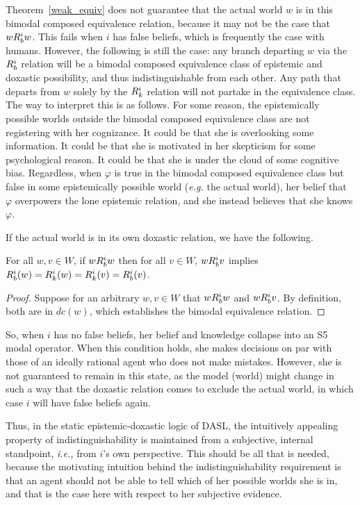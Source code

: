 Theorem~\ref{weak_equiv} does not guarantee that the actual world $w$ is in this bimodal composed equivalence relation, because it may not be the case that $wR_{b}^iw$. This fails when $i$ has false beliefs, which is frequently the case with humans. However, the following is still the case: any branch departing $w$ via the $R_{b}^i$ relation will be a bimodal composed equivalence class of epistemic and doxastic possibility, and thus indistinguishable from each other. Any path that departs from $w$ solely by the $R_{k}^i$ relation will not partake in the equivalence class. The way to interpret this is as follows. For some reason, the epistemically possible worlds outside the bimodal composed equivalence class are not registering with her cognizance. It could be that she is overlooking some information. It could be that she is motivated in her skepticism for some psychological reason. It could be that she is under the cloud of some cognitive bias. Regardless, when $\varphi$ is true in the bimodal composed equivalence class but false in some epistemically possible world (\emph{e.g.} the actual world), her belief that $\varphi$ overpowers the lone epistemic relation, and she instead believes that she knows $\varphi$.

If the actual world is in its own doxastic relation, we have the following. 

\begin{theorem}
	For all $w,v \in W$, if $wR_{b}^i w$ then for all $v \in W$, $wR_{b}^iv$ implies $R_{b}^i(w) = R_{k}^i(w) = R_{k}^i(v) = R_{b}^i(v)$.
\end{theorem}
\begin{proof}
	Suppose for an arbitrary $w,v\in W$ that $wR_{b}^iw$ and $wR_{b}^iv$. By definition, both are in $dc(w)$, which establishes the bimodal equivalence relation.
\end{proof}

So, when $i$ has no false beliefs, her belief and knowledge collapse into an S5 modal operator. When this condition holds, she makes decisions on par with those of an ideally rational agent who does not make mistakes. However, she is not guaranteed to remain in this state, as the model (world) might change in such a way that the doxastic relation comes to exclude the actual world, in which case $i$ will have false beliefs again.

Thus, in the static epistemic-doxastic logic of DASL, the intuitively appealing property of indistinguishability is maintained from a subjective, internal standpoint, \emph{i.e.,} from $i$'s own perspective. This should be all that is needed, because the motivating intuition behind the indistinguishability requirement is that an agent should not be able to tell which of her possible worlds she is in, and that is the case here with respect to her subjective evidence.

